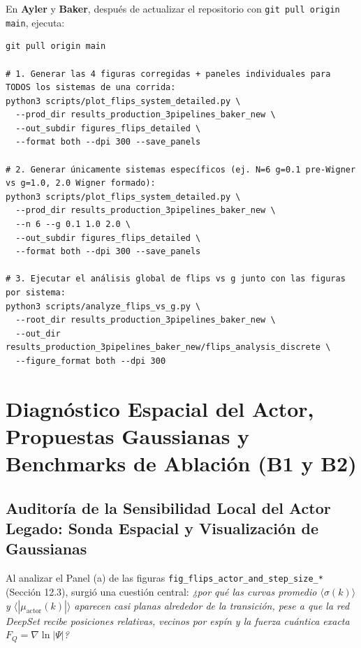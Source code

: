 \documentclass[10pt,a4paper]{article}
\begin{document}
En \textbf{Ayler} y \textbf{Baker}, después de actualizar el repositorio con \texttt{git pull origin main}, ejecuta:

\begin{verbatim}
git pull origin main

# 1. Generar las 4 figuras corregidas + paneles individuales para TODOS los sistemas de una corrida:
python3 scripts/plot_flips_system_detailed.py \
  --prod_dir results_production_3pipelines_baker_new \
  --out_subdir figures_flips_detailed \
  --format both --dpi 300 --save_panels

# 2. Generar únicamente sistemas específicos (ej. N=6 g=0.1 pre-Wigner vs g=1.0, 2.0 Wigner formado):
python3 scripts/plot_flips_system_detailed.py \
  --prod_dir results_production_3pipelines_baker_new \
  --n 6 --g 0.1 1.0 2.0 \
  --out_subdir figures_flips_detailed \
  --format both --dpi 300 --save_panels

# 3. Ejecutar el análisis global de flips vs g junto con las figuras por sistema:
python3 scripts/analyze_flips_vs_g.py \
  --root_dir results_production_3pipelines_baker_new \
  --out_dir results_production_3pipelines_baker_new/flips_analysis_discrete \
  --figure_format both --dpi 300
\end{verbatim}

\newpage
\section{Diagnóstico Espacial del Actor, Propuestas Gaussianas y Benchmarks de Ablación (B1 y B2)}

\subsection{Auditoría de la Sensibilidad Local del Actor Legado: Sonda Espacial y Visualización de Gaussianas}

Al analizar el Panel (a) de las figuras \texttt{fig\_flips\_actor\_and\_step\_size\_*} (Sección 12.3), surgió una cuestión central: \textit{¿por qué las curvas promedio $\langle \sigma(k) \rangle$ y $\langle |\mu_{\mathrm{actor}}(k)| \rangle$ aparecen casi planas alrededor de la transición, pese a que la red DeepSet recibe posiciones relativas, vecinos por espín y la fuerza cuántica exacta $F_Q = \nabla \ln |\Psi|$?}
\end{document}
